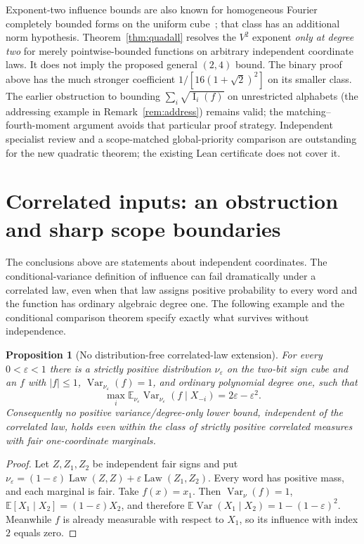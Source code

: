 \documentclass[11pt]{article}
\numberwithin{equation}{section}
\newtheorem{proposition}[theorem]{Proposition}
\theoremstyle{remark}
\newcommand{\Inf}{\operatorname{I}}
\begin{document}
Exponent-two influence bounds are also known for homogeneous Fourier completely bounded forms on the uniform cube~\cite[Theorem~1.6]{EG23}; that class has an additional norm hypothesis. Theorem~\ref{thm:quadall} resolves the $V^2$ exponent \emph{only at degree two} for merely pointwise-bounded functions on arbitrary independent coordinate laws. It does not imply the proposed general $(2,4)$ bound. The binary proof above has the much stronger coefficient $1/[16(1+\sqrt2)^2]$ on its smaller class. The earlier obstruction to bounding $\sum_i\sqrt{\Inf_i(f)}$ on unrestricted alphabets (the addressing example in Remark~\ref{rem:address}) remains valid; the matching--fourth-moment argument avoids that particular proof strategy. Independent specialist review and a scope-matched global-priority comparison are outstanding for the new quadratic theorem; the existing Lean certificate does not cover it.





\section{Correlated inputs: an obstruction and sharp scope boundaries}\label{sec:correlated}
The conclusions above are statements about independent coordinates. The
conditional-variance definition of influence can fail dramatically under
a correlated law, even when that law assigns positive probability to every
word and the function has ordinary algebraic degree one. The following
example and the conditional comparison theorem specify exactly what
survives without independence.

\begin{proposition}[No distribution-free correlated-law extension]\label{prop:corrno}
For every $0<\varepsilon<1$ there is a strictly positive distribution
$\nu_\varepsilon$ on the two-bit sign cube and an $f$ with $|f|\le1$,
$\operatorname{Var}_{\nu_\varepsilon}(f)=1$, and ordinary polynomial
degree one, such that
\[
 \max_i\mathbb E_{\nu_\varepsilon}
   \operatorname{Var}_{\nu_\varepsilon}(f\mid X_{-i})
 =2\varepsilon-\varepsilon^2.
\]
Consequently no positive variance/degree-only lower bound, independent of
the correlated law, holds even within the class of strictly positive
correlated measures with fair one-coordinate marginals.
\end{proposition}
\begin{proof}
Let $Z,Z_1,Z_2$ be independent fair signs and put
$\nu_\varepsilon=(1-\varepsilon)\operatorname{Law}(Z,Z)
+\varepsilon\operatorname{Law}(Z_1,Z_2)$.
Every word has positive mass, and each marginal is fair. Take $f(x)=x_1$.
Then $\operatorname{Var}_\nu(f)=1$, $\mathbb E[X_1\mid X_2]
=(1-\varepsilon)X_2$, and therefore
$\mathbb E\operatorname{Var}(X_1\mid X_2)
=1-(1-\varepsilon)^2$. Meanwhile $f$ is already measurable
with respect to $X_1$, so its influence with index $2$ equals zero.
\end{proof}
\end{document}
